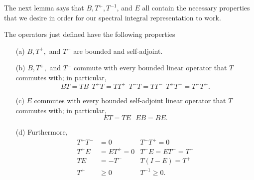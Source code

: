 The next lemma says that \( B , T^{+}, T^{-1}  \), and \( E \) all contain the necessary properties that we desire in order for our spectral integral representation to work. 

\begin{lemma}\label{9.8-1} 
    The operators just defined have the following properties 
    \begin{enumerate}
        \item[(a)] \( B , T^{+},  \) and \( T^{-} \) are bounded and self-adjoint.
        \item[(b)] \( B, T^{+},  \) and \( T^{-} \) commute with every bounded linear operator that \( T  \) commutes with; in particular,
            \[  BT = TB  \ \ T^{+}T = T T^{+} \ \ T^{-} T = T T^{-} \ \ T^{+} T^{-} = T^{-} T^{+}.  \]
        \item[(c)] \( E  \) commutes with every bounded self-adjoint linear operator that \( T  \) commutes with; in particular, 
            \[  E T = TE  \ \ \ EB = BE.  \]
        \item[(d)] Furthermore,
            \begin{align*}
                T^{+} T^{-} &= 0   &T^{-} T^{+} = 0   \\
                T^{+} E &= E T^{+ } = 0   &T^{-}E = E T^{-} = T^{-} \\
                TE  &= - T^{-}   &T(I  - E ) = T^{+} \\
                T^{+} &\geq 0   &T^{-1} \geq 0. 
            \end{align*}
    \end{enumerate}
\end{lemma}
